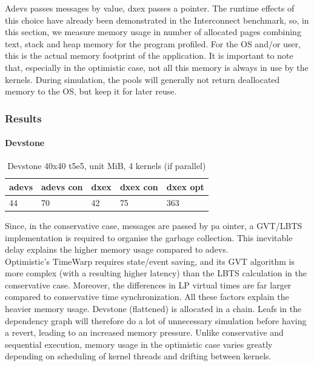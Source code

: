 Adevs passes messages by value, dxex passes a pointer. The runtime effects of this choice have already been demonstrated in the Interconnect benchmark, so, in this section, we measure memory usage in number of allocated pages combining text, stack and heap memory for the program profiled. For the OS and/or user, this is the actual memory footprint of the application. It is important to note that, especially in the optimistic case, not all this memory is always in use by the kernels. During simulation, the pools will generally not return deallocated memory to the OS, but keep it for later reuse.
\subsubsection{Results}
\paragraph*{Devstone}
\begin{table}[htb]
	\centering
	\begin{tabular}{| l | l | l | l | l |}
		\hline
		adevs & adevs con &dxex &dxex con&dxex opt\\ \hline
		44 & 70 & 42 & 75 & 363  \\ \hline
	\end{tabular}
	\caption{Devstone 40x40 t5e5, unit MiB, 4 kernels (if parallel)}
\end{table}
Since, in the conservative case, messages are passed by pa ointer, a GVT/LBTS implementation is required to organise the garbage collection. This inevitable delay explains the higher memory usage compared to adevs.\\
Optimistic's TimeWarp requires state/event saving, and its GVT algorithm is more complex (with a resulting higher latency) than the LBTS calculation in the conservative case. 
Moreover, the differences in LP virtual times are far larger compared to conservative time synchronization. All these factors explain the heavier memory usage. Devstone (flattened) is allocated in a chain. Leafs in the dependency graph will therefore do a lot of unnecessary simulation before having a revert, leading to an increased memory pressure. Unlike conservative and sequential execution, memory usage in the optimistic case varies greatly depending on scheduling of kernel threads and drifting between kernels. 
